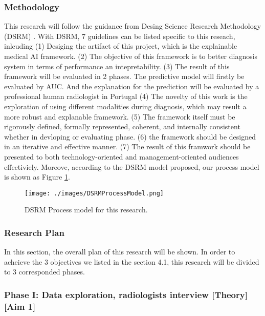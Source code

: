 \subsubsection{Methodology}
This research will follow the guidance from Desing Science Research Methodology (DSRM) \citep{Hevner2004DSRM}. With DSRM, 7 guidelines can be listed specific to this reseach, inlcuding (1) Desiging the artifact of this project, which is the explainable medical AI framework. (2) The objective of this framework is to better diagnosis system in terms of performance an intepretability. (3) The result of this framework will be evaluated in 2 phases. The predictive model will firstly be evaluated by AUC. And the explanation for the prediction will be evaluated by a professional human radiologist in Portugal (4) The novelty of this work is the exploration of using different modalities during diagnosis, which may result a more robust and explanable framework. (5) The framework itself must be rigorously defined, formally represented, coherent, and internally consistent whether in devloping or evaluating phase. (6) the framework should be designed in an iterative and effective manner. (7) The result of this framwork should be presented to both technology-oriented and management-oriented audiences effectiviely. Moreove, according to the DSRM model \citep{Peffers2007DSRMForIS} proposed, our process model is shown as Figure \ref{fig: DSRMProcessModel}.


\begin{figure}[!h]
    \centering
    \texttt{[image: ./images/DSRMProcessModel.png]}
    \caption{DSRM Process model for this research.}
    \label{fig: DSRMProcessModel}
\end{figure}

\subsubsection{Research Plan}


In this section, the overall plan of this research will be shown. In order to acheieve the 3 objectives we listed in the section 4.1, this research will be divided to 3 corresponded phases.

\subsubsection*{Phase I: Data exploration, radiologists interview [Theory] [Aim 1]}

